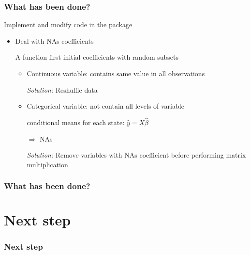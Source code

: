 \documentclass{beamer}
\begin{document}
\begin{frame}
\frametitle{What has been done?}
Implement and modify code in the package
\begin{itemize}
	\item Deal with NAs coefficients
	
	A function first initial coefficients with random subsets
	
	\begin{itemize}	
		\item Continuous variable: contains same value in all observations
		
		\vspace{2pt}
		
		\textit{Solution:} Reshuffle data
		
		\vspace{5pt}
		
		\item Categorical variable: not contain all levels of variable
		
		\vspace{2pt}
		
		conditional means for each state: $\hat{y} = X \hat{\beta}$
		
		$\Rightarrow$ NAs
		
		\vspace{2pt}
		
		\textit{Solution:} Remove variables with NAs coefficient before performing matrix multiplication
	\end{itemize}
\end{itemize}
\end{frame}

\begin{frame}
\frametitle{What has been done?}


\end{frame}

\section{Next step}
\begin{frame}
\frametitle{Next step}

\end{frame}
\end{document}
